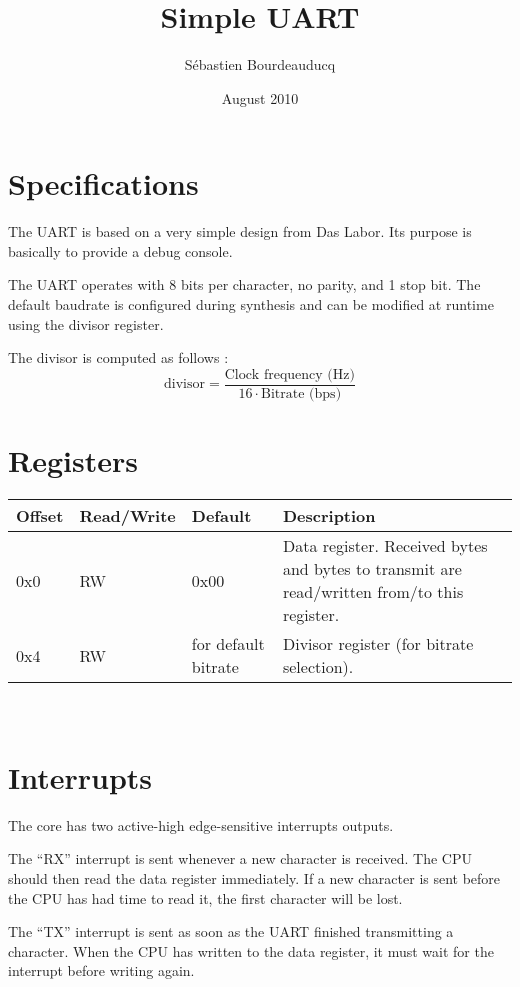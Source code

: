 \documentclass[a4paper,11pt]{article}
\title{Simple UART}
\author{S\'ebastien Bourdeauducq}
\date{August 2010}
\begin{document}
\setlength{\parindent}{0pt}
\setlength{\parskip}{5pt}
\maketitle{}
\section{Specifications}
The UART is based on a very simple design from Das Labor. Its purpose is basically to provide a debug console.

The UART operates with 8 bits per character, no parity, and 1 stop bit. The default baudrate is configured during synthesis and can be modified at runtime using the divisor register.

The divisor is computed as follows :
\begin{equation*}
\text{divisor} = \frac{\text{Clock frequency (Hz)}}{16 \cdot \text{Bitrate (bps)}}
\end{equation*}

\section{Registers}
\begin{tabularx}{\textwidth}{|l|l|l|X|}
\hline
\bf{Offset} & \bf{Read/Write} & \bf{Default} & \bf{Description} \\
\hline
0x0 & RW & 0x00 & Data register. Received bytes and bytes to transmit are read/written from/to this register. \\
\hline
0x4 & RW & for default bitrate & Divisor register (for bitrate selection). \\
\hline
\end{tabularx}\\

\section{Interrupts}
The core has two active-high edge-sensitive interrupts outputs.

The ``RX'' interrupt is sent whenever a new character is received. The CPU should then read the data register immediately. If a new character is sent before the CPU has had time to read it, the first character will be lost.

The ``TX'' interrupt is sent as soon as the UART finished transmitting a character. When the CPU has written to the data register, it must wait for the interrupt before writing again.
\end{document}
